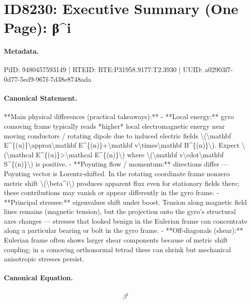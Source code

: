 \section*{ID8230: Executive Summary (One Page): β\textasciicircum{}i}
\paragraph{Metadata.}
PiID: 9480457593149 | RTEID: RTE:P31958.9177:T2.3930 | UUID: a02903f7-0d77-5ed9-967f-7d38e8748ada

\paragraph{Canonical Statement.}
**Main physical differences (practical takeaways):** - **Local energy:** gyro comoving frame typically reads *higher* local electromagnetic energy near moving conductors / rotating dipole due to induced electric fields \textbackslash{}(\textbackslash{}mathbf E\textasciicircum{}\{(u)\}\textbackslash{}approx\textbackslash{}mathbf E\textasciicircum{}\{(n)\}+\textbackslash{}mathbf v\textbackslash{}times\textbackslash{}mathbf B\textasciicircum{}\{(n)\}\textbackslash{}). Expect \textbackslash{}(\textbackslash{}mathcal E\textasciicircum{}\{(u)\}>\textbackslash{}mathcal E\textasciicircum{}\{(n)\}\textbackslash{}) where \textbackslash{}(\textbackslash{}mathbf v\textbackslash{}cdot\textbackslash{}mathbf S\textasciicircum{}\{(n)\}\textbackslash{}) is positive. - **Poynting flow / momentum:** directions differ — Poynting vector is Lorentz-shifted. In the rotating coordinate frame nonzero metric shift \textbackslash{}(\textbackslash{}beta\textasciicircum{}i\textbackslash{}) produces apparent flux even for stationary fields there; these contributions may vanish or appear differently in the gyro frame. - **Principal stresses:** eigenvalues shift under boost. Tension along magnetic field lines remains (magnetic tension), but the projection onto the gyro’s structural axes changes — stresses that looked benign in the Eulerian frame can concentrate along a particular bearing or bolt in the gyro frame. - **Off-diagonals (shear):** Eulerian frame often shows larger shear components because of metric shift coupling; in a comoving orthonormal tetrad these can shrink but mechanical anisotropic stresses persist.

\paragraph{Canonical Equation.}
\[
\beta^i
\]

